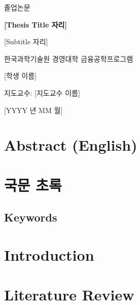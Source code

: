 \documentclass[12pt,a4paper]{report}
\begin{document}

\begin{titlepage}
\centering
\vspace*{3cm}
{\Large 졸업논문 \par}
\vspace{2cm}
{\huge\bfseries [Thesis Title 자리]\par}
\vspace{0.5cm}
{\large [Subtitle 자리]\par}
\vspace{3cm}
{\large 한국과학기술원 경영대학 금융공학프로그램\par}
\vspace{0.5cm}
{\large [학생 이름]\par}
\vspace{0.5cm}
{\large 지도교수: [지도교수 이름]\par}
\vfill
{\large [YYYY 년 MM 월]\par}
\end{titlepage}

\chapter*{Abstract (English)}

\chapter*{국문 초록}

\section*{Keywords}

\tableofcontents
\listoffigures
\listoftables


\chapter{Introduction}
\label{ch:introduction}

\chapter{Literature Review}
\label{ch:literature}
\end{document}
